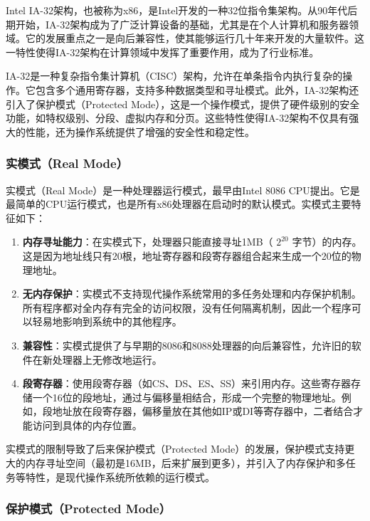 Intel IA-32架构，也被称为x86，是Intel开发的一种32位指令集架构。从90年代后期开始，IA-32架构成为了广泛计算设备的基础，尤其是在个人计算机和服务器领域。它的发展重点之一是向后兼容性，使其能够运行几十年来开发的大量软件。这一特性使得IA-32架构在计算领域中发挥了重要作用，成为了行业标准。

IA-32是一种复杂指令集计算机（CISC）架构，允许在单条指令内执行复杂的操作。它包含多个通用寄存器，支持多种数据类型和寻址模式。此外，IA-32架构还引入了保护模式（Protected Mode），这是一个操作模式，提供了硬件级别的安全功能，如特权级别、分段、虚拟内存和分页。这些特性使得IA-32架构不仅具有强大的性能，还为操作系统提供了增强的安全性和稳定性。

\subsubsection{实模式（Real Mode）}

实模式（Real Mode）是一种处理器运行模式，最早由Intel 8086 CPU提出。它是最简单的CPU运行模式，也是所有x86处理器在启动时的默认模式。实模式主要特征如下：

\begin{enumerate}
    \item \textbf{内存寻址能力}：在实模式下，处理器只能直接寻址1MB（ $2^{20}$ 字节）的内存。这是因为地址线只有20根，地址寄存器和段寄存器组合起来生成一个20位的物理地址。
    \item \textbf{无内存保护}：实模式不支持现代操作系统常用的多任务处理和内存保护机制。所有程序都对全内存有完全的访问权限，没有任何隔离机制，因此一个程序可以轻易地影响到系统中的其他程序。
    \item \textbf{兼容性}：实模式提供了与早期的8086和8088处理器的向后兼容性，允许旧的软件在新处理器上无修改地运行。
    \item \textbf{段寄存器}：使用段寄存器（如CS、DS、ES、SS）来引用内存。这些寄存器存储一个16位的段地址，通过与偏移量相结合，形成一个完整的物理地址。例如，段地址放在段寄存器，偏移量放在其他如IP或DI等寄存器中，二者结合才能访问到具体的内存位置。
\end{enumerate}

实模式的限制导致了后来保护模式（Protected Mode）的发展，保护模式支持更大的内存寻址空间（最初是16MB，后来扩展到更多），并引入了内存保护和多任务等特性，是现代操作系统所依赖的运行模式。

\subsubsection{保护模式（Protected Mode）}

